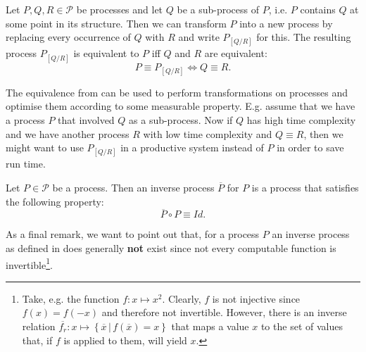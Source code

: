 \begin{definition}
\label{def:process_substitution}
Let $P, Q, R \in \mathcal{P}$ be processes and let $Q$ be a sub-process of $P$, i.e. $P$ contains $Q$ at some point in its structure. Then we can transform $P$ into a new process by replacing every occurrence of $Q$ with $R$ and write $P_{\left[ Q / R \right]}$ for this. The resulting process $P_{\left[ Q / R \right]}$ is equivalent to $P$ iff $Q$ and $R$ are equivalent:
  \begin{equation}
    P \equiv P_{\left[ Q / R \right]} \Leftrightarrow Q \equiv R.
  \end{equation}
  \hfill\qedsymbol
\end{definition}

The equivalence from  can be used to perform transformations on processes and optimise them according to some measurable property. E.g. assume that we have a process $P$ that involved $Q$ as a sub-process. Now if $Q$ has high time complexity and we have another process $R$ with low time complexity and $Q \equiv R$, then we might want to use $P_{\left[ Q / R \right]}$ in a productive system instead of $P$ in order to save run time.

\begin{definition}
\label{def:inverse_process}
Let $P \in \mathcal{P}$ be a process. Then an inverse process $\overline{P}$ for $P$ is a process that satisfies the following property:
  \begin{equation}
    \overline{P} \circ P \equiv Id.
  \end{equation}
  \hfill\qedsymbol
\end{definition}

As a final remark, we want to point out that, for a process $P$ an inverse process as defined in  does generally \textbf{not} exist since not every computable function is invertible\footnote{Take, e.g. the function $f \colon x \mapsto x^2$. Clearly, $f$ is not injective since $f \left( x \right) = f \left( -x \right)$ and therefore not invertible. However, there is an inverse relation $\overline{f_r} \colon x \mapsto \left\{ \overline{x} \,|\, f \left( \overline{x} \right) = x \right\}$ that maps a value $x$ to the set of values that, if $f$ is applied to them, will yield $x$.}.






